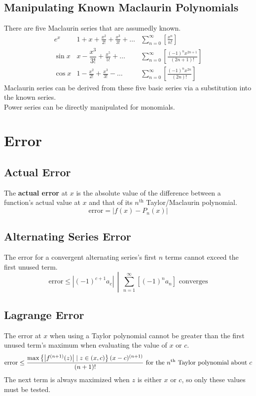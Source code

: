 \documentclass{../AP_Calculus}
\begin{document}
			\subsection*{Manipulating Known Maclaurin Polynomials}
				There are five Maclaurin series that are assumedly known.
				\begingroup
					\renewcommand{\arraystretch}{2}
					\[\begin{array}{l|l|l}
						\displaystyle e^x &\displaystyle 1 + x + \frac{x^2}{2!} + \frac{x^3}{3!} + \ldots &\displaystyle \sum_{n = 0}^\infty\left[\frac{x^n}{n!}\right] \\
						\displaystyle \sin x &\displaystyle x - \dfrac{x^3}{3!} + \frac{x^5}{5!} + \ldots &\displaystyle \sum_{n = 0}^\infty\left[\frac{(-1)^nx^{2n + 1}}{(2n + 1)!}\right] \\
						\displaystyle \cos x &\displaystyle 1 - \frac{x^2}{2!} + \frac{x^3}{3!} - \ldots &\displaystyle \sum_{n = 0}^\infty\left[\frac{(-1)^nx^{2n}}{(2n)!}\right]
					\end{array}\]
				\endgroup
				Maclaurin series can be derived from these five basic series via a substitution into the known series. \\
				Power series can be directly manipulated for monomials.
		\section{Error}
			\subsection{Actual Error}
				The \textbf{actual error} at $x$ is the absolute value of the difference between a function's actual value at $x$ and that of its $n^{\mathrm{th}}$ Taylor/Maclaurin polynomial.
				\[\mathrm{error} = |f(x) - P_n(x)|\]
			\subsection{Alternating Series Error}
				The error for a convergent alternating series's first $n$ terms cannot exceed the first unused term.
				\[\left.\mathrm{error} \le \left|(-1)^{c + 1}a_c\right|\, \middle|\, \sum_{n = 1}^\infty\left[(-1)^na_n\right] \text{ converges}\right.\]
			\subsection{Lagrange Error}
				The error at $x$ when using a Taylor polynomial cannot be greater than the first unused term's maximum when evaluating the value of $x$ or $c$.
				\[\mathrm{error} \le \frac{\mathrm{max}\left\{\left|f^{(n + 1)}(z)\right| \mid z \in (x, c)\right\}(x - c)^{(n + 1)}}{(n + 1)!} \text{ for the \(n^{\mathrm{th}}\) Taylor polynomial about $c$}\]
				The next term is always maximized when $z$ is either $x$ or $c$, so only these values must be tested.
\end{document}
